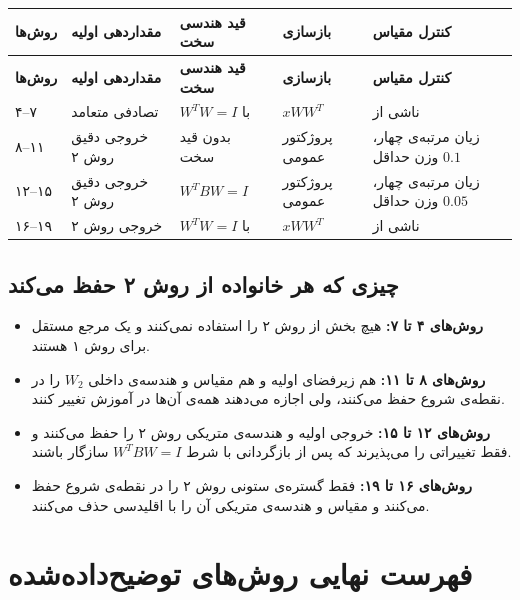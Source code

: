 \documentclass[a4paper,12pt]{article}
\newcommand{\QR}{\lr{QR}}
\begin{document}
\begin{longtable}{|C{1.8cm}|C{3.1cm}|C{3cm}|C{3.2cm}|C{3.3cm}|}
\hline
\textbf{روش‌ها} & \textbf{مقداردهی اولیه} & \textbf{قید هندسی سخت} & \textbf{بازسازی} & \textbf{کنترل مقیاس} \\
\hline
\endfirsthead
\hline
\textbf{روش‌ها} & \textbf{مقداردهی اولیه} & \textbf{قید هندسی سخت} & \textbf{بازسازی} & \textbf{کنترل مقیاس} \\
\hline
\endhead
۴--۷ & تصادفی متعامد & $W^{T}W=I$ با \QR{} & $xWW^{T}$ & ناشی از \QR{} \\
\hline
۸--۱۱ & خروجی دقیق روش ۲ & بدون قید سخت & پروژکتور عمومی & زیان مرتبه‌ی چهار، وزن حداقل $0.1$ \\
\hline
۱۲--۱۵ & خروجی دقیق روش ۲ & $W^{T}BW=I$ & پروژکتور عمومی & زیان مرتبه‌ی چهار، وزن حداقل $0.05$ \\
\hline
۱۶--۱۹ & \QR{} خروجی روش ۲ & $W^{T}W=I$ با \QR{} & $xWW^{T}$ & ناشی از \QR{} \\
\hline
\end{longtable}

\subsection{چیزی که هر خانواده از روش ۲ حفظ می‌کند}

\begin{itemize}
 \item \textbf{روش‌های ۴ تا ۷:} هیچ بخش از روش ۲ را استفاده نمی‌کنند و یک مرجع مستقل برای روش ۱ هستند.
 \item \textbf{روش‌های ۸ تا ۱۱:} هم زیرفضای اولیه و هم مقیاس و هندسه‌ی داخلی $W_2$ را در نقطه‌ی شروع حفظ می‌کنند، ولی اجازه می‌دهند همه‌ی آن‌ها در آموزش تغییر کنند.
 \item \textbf{روش‌های ۱۲ تا ۱۵:} خروجی اولیه و هندسه‌ی متریکی روش ۲ را حفظ می‌کنند و فقط تغییراتی را می‌پذیرند که پس از بازگردانی با شرط $W^{T}BW=I$ سازگار باشند.
 \item \textbf{روش‌های ۱۶ تا ۱۹:} فقط گستره‌ی ستونی روش ۲ را در نقطه‌ی شروع حفظ می‌کنند و مقیاس و هندسه‌ی متریکی آن را با \QR{} اقلیدسی حذف می‌کنند.
\end{itemize}

\section{فهرست نهایی روش‌های توضیح‌داده‌شده}
\end{document}

